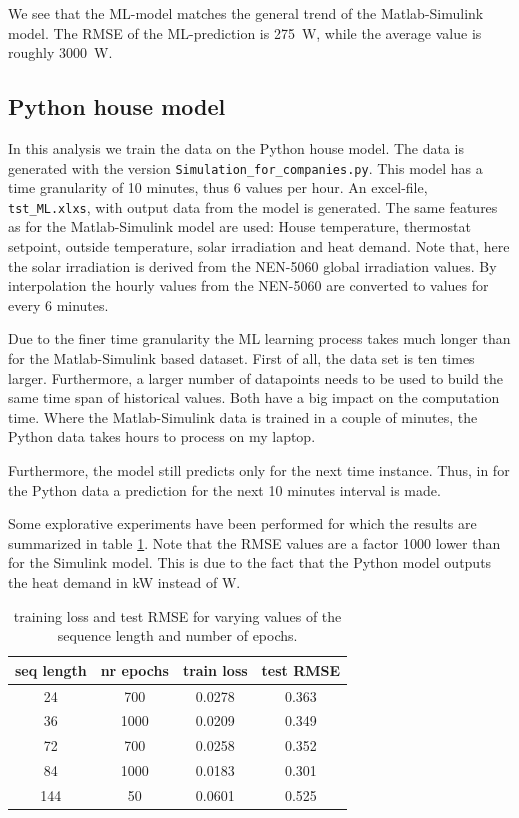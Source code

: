 We see that the ML-model matches the general trend of the Matlab-Simulink model. The RMSE of the ML-prediction is 275~W, while the average value is roughly 3000~W. 


\subsection{Python house model}
In this analysis we train the data on the Python house model. The data is generated with the version \texttt{Simulation\_for\_companies.py}. This model has a time granularity of 10 minutes, thus 6 values per hour. An excel-file, \texttt{tst\_ML.xlxs}, with output data from the model is generated. The same features as for the Matlab-Simulink model are used: House temperature, thermostat setpoint, outside temperature, solar irradiation and heat demand. Note that, here the solar irradiation is derived from the NEN-5060 global irradiation values. By interpolation the hourly values from the NEN-5060 are converted to values for every 6 minutes.  

Due to the finer time granularity the ML learning process takes much longer than for the Matlab-Simulink based dataset. First of all, the data set is ten times larger. Furthermore, a larger number of datapoints needs to be used to build the same time span of historical values. Both have a big impact on the computation time. Where the Matlab-Simulink data is trained in a couple of minutes, the Python data takes hours to process on my laptop. 

Furthermore, the model still predicts only for the next time instance. Thus, in for the Python data a prediction for the next 10 minutes interval is made.  

Some explorative experiments have been performed for which the results are summarized in table \ref{tab:results_python}. Note that the RMSE values are a factor 1000 lower than for the Simulink model. This is due to the fact that the Python model outputs the heat demand in kW instead of W. 

\begin{table}
	\centering
		\begin{tabular}{c|c|c|c}
				\hline
					seq length & nr epochs & train loss & test RMSE  \\
				\hline
				\hline
					24 & 700 & 0.0278 & 0.363 \\
					36 & 1000 & 0.0209	& 0.349 \\
					72 & 700 & 0.0258	& 0.352 \\
					84 & 1000 & 0.0183 & 0.301\\
					144 & 50 & 0.0601 & 0.525\\
					\hline
		\end{tabular}
	\caption{training loss and test RMSE for varying values of the sequence length and number of epochs. }
	\label{tab:results_python}
\end{table}
 

